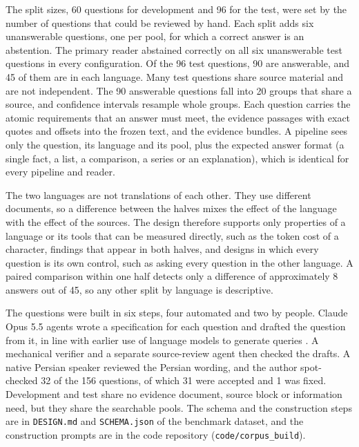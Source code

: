 The split sizes, 60 questions for development and 96 for the test, were set by the number of questions that could be reviewed by hand. Each split adds six unanswerable questions, one per pool, for which a correct answer is an abstention. The primary reader abstained correctly on all six unanswerable test questions in every configuration. %
Of the 96 test questions, 90 are answerable, and 45 of them are in each language. Many test questions share source material and are not independent. The 90 answerable questions fall into 20 groups that share a source, and confidence intervals resample whole groups. Each question carries the atomic requirements that an answer must meet, the evidence passages with exact quotes and offsets into the frozen text, and the evidence bundles. A pipeline sees only the question, its language and its pool, plus the expected answer format (a single fact, a list, a comparison, a series or an explanation), which is identical for every pipeline and reader.

The two languages are not translations of each other. They use different documents, so a difference between the halves mixes the effect of the language with the effect of the sources. The design therefore supports only properties of a language or its tools that can be measured directly, such as the token cost of a character, findings that appear in both halves, and designs in which every question is its own control, such as asking every question in the other language. A paired comparison within one half detects only a difference of approximately 8 answers out of 45, so any other split by language is descriptive.

The questions were built in six steps, four automated and two by people. Claude Opus 5.5 agents wrote a specification for each question and drafted the question from it, in line with earlier use of language models to generate queries \citep{bonifacio2022inpars,dai2023promptagator}. A mechanical verifier and a separate source-review agent then checked the drafts. A native Persian speaker reviewed the Persian wording, and the author spot-checked 32 of the 156 questions, of which 31 were accepted and 1 was fixed. Development and test share no evidence document, source block or information need, but they share the searchable pools. The schema and the construction steps are in \texttt{DESIGN.md} and \texttt{SCHEMA.json} of the benchmark dataset, and the construction prompts are in the code repository (\texttt{code/corpus\_build}).

